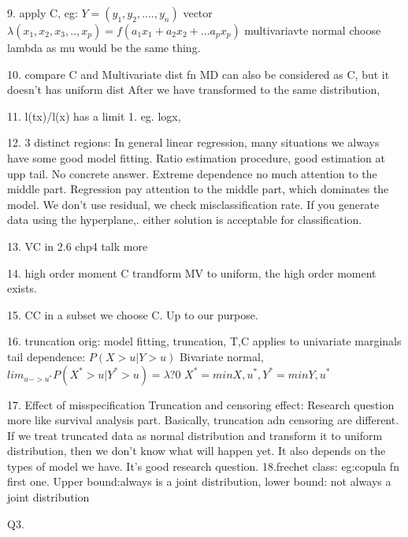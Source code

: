 \documentclass[a4paper,12pt]{texMemo}
\begin{document}
9. apply C, eg:
$Y=(y_1,y_2,....,y_n)$    vector $\lambda(x_1,x_2,x_3,..,x_p)=f(a_1x_1+a_2x_2+...a_px_p)$
multivariavte normal choose lambda as mu would be the same thing.

10. compare C and Multivariate dist fn
MD can also be considered as C, but it doesn't has uniform dist
After we have transformed to the same distribution, 

11. l(tx)/l(x) has a limit 1. eg. logx, 

12. 3 distinct regions:
In general linear regression, many situations we always have some good model fitting. 
Ratio estimation procedure, good estimation at upp tail.
No concrete answer.
Extreme dependence no much attention to the middle part.
Regression pay attention to the middle part, which dominates the model. 
We don't use residual, we check misclassification rate. 
If you generate data using the hyperplane,. either solution is acceptable for classification. 

13. VC in 2.6 chp4 talk more

14. high order moment
C trandform MV to uniform, the high order moment exists.

15. CC in a subset we choose C. Up to our purpose.

16. truncation 
orig: model fitting, truncation, 
T,C applies to univariate marginals 
tail dependence: $P(X>u|Y>u)$
Bivariate normal,  $lim_{u->u^*}P(X^*>u|Y^*>u)=\lambda?0$
$X^*=min{X,u^*},Y^*=min{Y,u^*}$   

17. Effect of misspecification
Truncation and censoring effect: Research question more like survival analysis part.
Basically, truncation adn censoring are different. If we treat truncated data as normal distribution and transform it to uniform distribution, then we don't know what will happen yet. It also depends on the types of model we have. It's good research question. 
18.frechet class:
eg:copula fn 
first one. 
Upper bound:always is a joint distribution, lower bound: not always a joint distribution

Q3.
\end{document}
